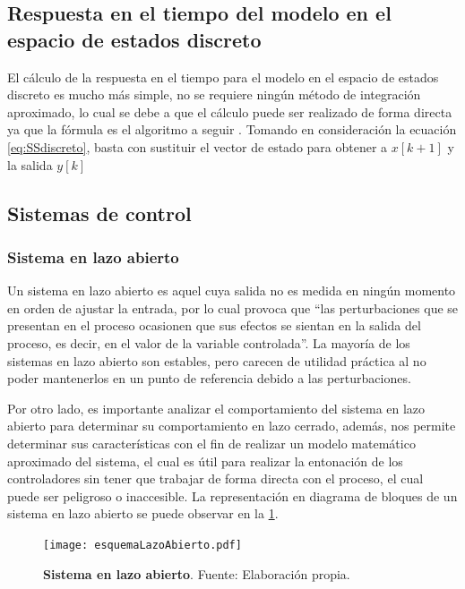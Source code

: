     \subsection{Respuesta en el tiempo del modelo en el espacio de estados discreto}
    
        El cálculo de la respuesta en el tiempo para el modelo en el espacio de estados discreto es mucho más simple, no se requiere ningún método de integración aproximado, lo cual se debe a que el cálculo puede ser realizado de forma directa ya que la fórmula es el algoritmo a seguir \Parencite{haugen2005discrete}. Tomando en consideración la ecuación \cref{eq:SSdiscreto}, basta con sustituir el vector de estado para obtener a $x[k+1]$ y la salida $y[k]$
        
    
        \subsection{Sistemas de control}
		
		\subsubsection{Sistema en lazo abierto}
		
            Un sistema en lazo abierto es aquel cuya salida no es medida en ningún momento en orden de ajustar la entrada, por lo cual provoca que \enquote{las perturbaciones que se presentan en el proceso ocasionen que sus efectos se sientan en la salida del proceso, es decir, en el valor de la variable controlada}\Parencite[p.$\,$350]{maloney2006electronica}. La mayoría de los sistemas en lazo abierto son estables, pero carecen de utilidad práctica al no poder mantenerlos en un punto de referencia debido a las perturbaciones.
            
            Por otro lado, es importante analizar el comportamiento del sistema en lazo abierto para determinar su comportamiento en lazo cerrado, además, nos permite determinar sus características con el fin de realizar un modelo matemático aproximado del sistema, el cual es útil para realizar la entonación de los controladores sin tener que trabajar de forma directa con el proceso, el cual puede ser peligroso o inaccesible. La representación en diagrama de bloques de un sistema en lazo abierto se puede observar en la \cref{fig:esquemaLazoAbierto}.
            
            \begin{figure}[htb]
				\centering
				\texttt{[image: esquemaLazoAbierto.pdf]}
				\caption[Ejemplo de un sistema en lazo abierto]{\textbf{Sistema en lazo abierto}. Fuente: Elaboración propia.} 
				\label{fig:esquemaLazoAbierto}
            \end{figure}
        
